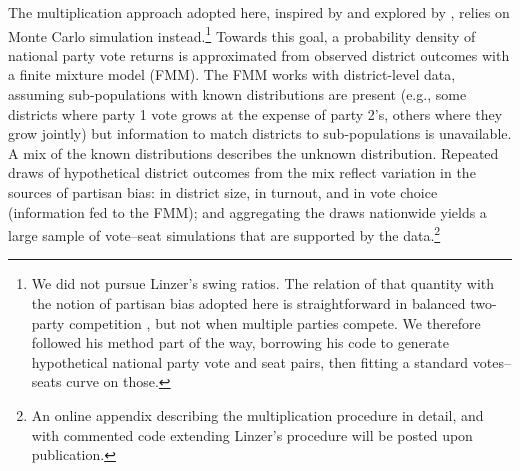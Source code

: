 \documentclass[letter,12pt]{article}
\begin{document}
The multiplication approach adopted here, inspired by \citet{linzerSeatVoteElasticity2012} and explored by \citet{marquez2014mixSwingBlog}, relies on Monte Carlo simulation instead.\footnote{We did not pursue Linzer's swing ratios. The relation of that quantity with the notion of partisan bias adopted here is straightforward in balanced two-party competition \citep[see][:410]{linzerSeatVoteElasticity2012}, but not when multiple parties compete. We therefore followed his method part of the way, borrowing his code to generate hypothetical national party vote and seat pairs, then fitting a standard votes--seats curve on those.} Towards this goal, a probability density of national party vote returns is approximated from observed district outcomes with a finite mixture model (FMM). The FMM works with district-level data, assuming sub-populations with known distributions are present (e.g., some districts where party 1 vote grows at the expense of party 2's, others where they grow jointly) but information to match districts to sub-populations is unavailable. A mix of the known distributions describes the unknown distribution. Repeated draws of hypothetical district outcomes from the mix reflect variation in the sources of partisan bias: in district size, in turnout, and in vote choice (information fed to the FMM); and aggregating the draws nationwide yields a large sample of vote--seat simulations that are supported by the data.\footnote{An online appendix describing the multiplication procedure in detail, and with commented code extending Linzer's procedure will be posted upon publication.} 
\end{document}
